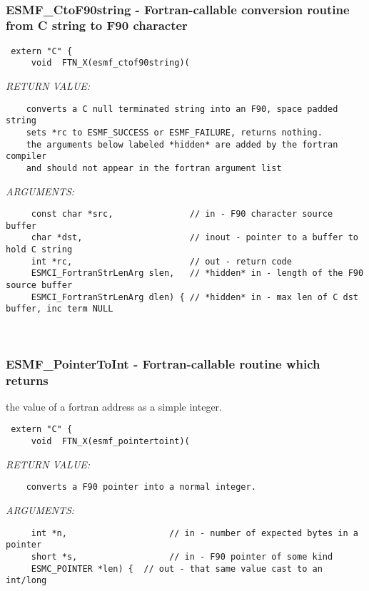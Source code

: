  
\mbox{}\hrulefill\
 
\subsubsection [ESMF\_CtoF90string] {ESMF\_CtoF90string - Fortran-callable conversion routine from C string to F90 character}


  
\begin{verbatim} extern "C" {
     void  FTN_X(esmf_ctof90string)(\end{verbatim}{\em RETURN VALUE:}
\begin{verbatim}    converts a C null terminated string into an F90, space padded string
    sets *rc to ESMF_SUCCESS or ESMF_FAILURE, returns nothing.
    the arguments below labeled *hidden* are added by the fortran compiler
    and should not appear in the fortran argument list\end{verbatim}{\em ARGUMENTS:}
\begin{verbatim}     const char *src,               // in - F90 character source buffer
     char *dst,                     // inout - pointer to a buffer to hold C string
     int *rc,                       // out - return code
     ESMCI_FortranStrLenArg slen,   // *hidden* in - length of the F90 source buffer
     ESMCI_FortranStrLenArg dlen) { // *hidden* in - max len of C dst buffer, inc term NULL\end{verbatim}
 
 
\mbox{}\hrulefill\
 
\subsubsection [ESMF\_PointerToInt] {ESMF\_PointerToInt - Fortran-callable routine which returns}


     the value of a fortran address as a simple integer.
  
\begin{verbatim} extern "C" {
     void  FTN_X(esmf_pointertoint)(\end{verbatim}{\em RETURN VALUE:}
\begin{verbatim}    converts a F90 pointer into a normal integer.\end{verbatim}{\em ARGUMENTS:}
\begin{verbatim}     int *n,                    // in - number of expected bytes in a pointer
     short *s,                  // in - F90 pointer of some kind
     ESMC_POINTER *len) {  // out - that same value cast to an int/long\end{verbatim}
 
